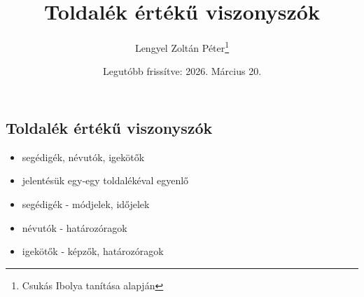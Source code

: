 \documentclass{article}
\title{Toldalék értékű viszonyszók}
\author{Lengyel Zoltán Péter\thanks{Csukás Ibolya tanítása alapján}}
\date{Legutóbb frissítve: 2026. Március 20.}
\begin{document}
\maketitle
\tableofcontents
\newpage

\begin{center}
    \section{Toldalék értékű viszonyszók}
\end{center}

\begin{itemize}
    \item segédigék, névutók, igekötők
    \item jelentésük egy-egy toldalékéval egyenlő
    \item segédigék - módjelek, időjelek
    \item névutók - határozóragok
    \item igekötők - képzők, határozóragok
\end{itemize}
\end{document}
